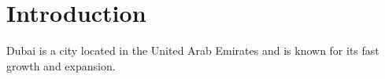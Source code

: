 \section{Introduction}
Dubai is a city located in the United Arab Emirates and is known for its fast growth and expansion.

